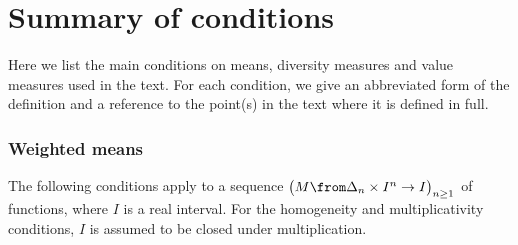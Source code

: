 \chapter{Summary of conditions}


Here we list the main conditions on means, diversity measures and value
measures used in the text.  For each condition, we give an abbreviated form
of the definition and a reference to the point(s) in the text where
it is defined in full.

\subsection*{Weighted means}

The following conditions apply to a sequence 
$
\bigl(M \from \Delta_n \times I^n \to I\bigr)_{n \geq 1}
$
of functions,
where $I$ is a real interval.  For the homogeneity and multiplicativity
conditions, $I$ is assumed to be closed under multiplication.

